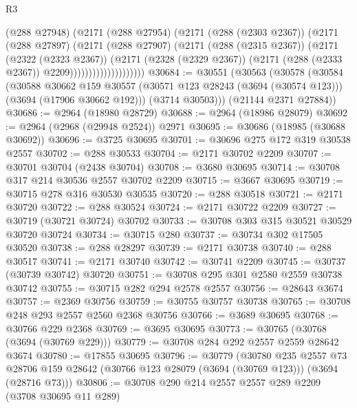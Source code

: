 \begin{lexlean}{R3}
\begin{coremodule}
                            (@288 @27948)
                            (@2171
                              (@288 @27954)
                              (@2171
                                (@288 (@2303 @2367))
                                (@2171
                                  (@288 @27897)
                                  (@2171
                                    (@288 @27907)
                                    (@2171
                                      (@288 (@2315 @2367))
                                      (@2171
                                        (@2322 (@2323 @2367))
                                        (@2171
                                          (@2328 (@2329 @2367))
                                          (@2171 (@288 (@2333 @2367)) @2209))))))))))))))))))))
@30684 := @30551
    (@30563
      (@30578
        (@30584
          (@30588
            @30662
            @159
            @30557
            (@30571 @123 @28243 (@3694 (@30574 @123)))
            (@3694 (@17906 @30662 @192)))
          (@3714 @30503)))
      (@21144 @2371 @27884))
@30686 := @2964 (@18980 @28729)
@30688 := @2964 (@18986 @28079)
@30692 := @2964 (@2968 (@29948 @2524)) @2971
@30695 := @30686 (@18985 (@30688 @30692))
@30696 := @3725 @30695
@30701 := @30696 @275 @172 @319 @30538 @2557
@30702 := @288 @30533
@30704 := @2171 @30702 @2209
@30707 := @30701 @30704 (@2438 @30704)
@30708 := @3680 @30695
@30714 := @30708 @317 @214 @30536 @2557 @30702 @2209
@30715 := @3667 @30695
@30719 := @30715 @278 @316 @30530 @30535
@30720 := @288 @30518
@30721 := @2171 @30720
@30722 := @288 @30524
@30724 := @2171 @30722 @2209
@30727 := @30719 (@30721 @30724) @30702
@30733 := @30708 @303 @315 @30521 @30529 @30720 @30724
@30734 := @30715 @280
@30737 := @30734 @302 @17505 @30520
@30738 := @288 @28297
@30739 := @2171 @30738
@30740 := @288 @30517
@30741 := @2171 @30740
@30742 := @30741 @2209
@30745 := @30737 (@30739 @30742) @30720
@30751 := @30708 @295 @301 @2580 @2559 @30738 @30742
@30755 := @30715 @282 @294 @2578 @2557
@30756 := @28643 @3674
@30757 := @2369 @30756
@30759 := @30755 @30757 @30738
@30765 := @30708 @248 @293 @2557 @2560 @2368 @30756
@30766 := @3689 @30695
@30768 := @30766 @229 @2368
@30769 := @3695 @30695
@30773 := @30765 (@30768 (@3694 (@30769 @229)))
@30779 := @30708 @284 @292 @2557 @2559 @28642 @3674
@30780 := @17855 @30695
@30796 := @30779
    (@30780
      @235
      @2557
      @73
      @28706
      @159
      @28642
      (@30766 @123 @28079 (@3694 (@30769 @123)))
      (@3694 (@28716 @73)))
@30806 := @30708 @290 @214 @2557 @2557 @289 @2209 (@3708 @30695 @11 @289)

\end{coremodule}
\end{lexlean}
